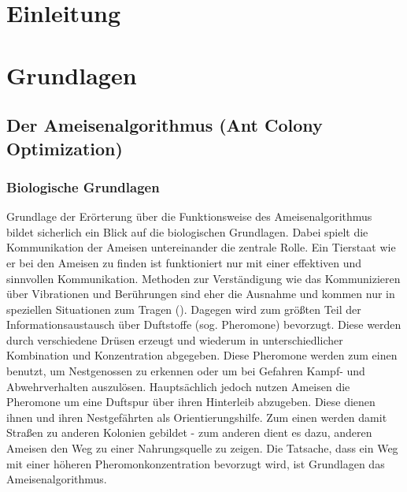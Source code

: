 \documentclass[doktyp=barbeit, sprache=german]{TUBAFarbeiten}
\begin{document}
\maketitle
\tableofcontents
\newpage
\section{Einleitung}
\section{Grundlagen}
\subsection{Der Ameisenalgorithmus (Ant Colony Optimization)}
\subsubsection{Biologische Grundlagen}
Grundlage der Erörterung über die Funktionsweise des Ameisenalgorithmus bildet sicherlich ein Blick auf die biologischen Grundlagen. Dabei spielt die Kommunikation der Ameisen untereinander die zentrale Rolle. Ein Tierstaat wie er bei den Ameisen zu finden ist funktioniert nur mit einer effektiven und sinnvollen Kommunikation. Methoden zur Verständigung wie das Kommunizieren über Vibrationen und Berührungen sind eher die Ausnahme und kommen nur in speziellen Situationen zum Tragen (\cite{Ameisen}). Dagegen wird zum größten Teil der Informationsaustausch über Duftstoffe (sog. Pheromone) bevorzugt. Diese werden durch verschiedene Drüsen erzeugt und wiederum in unterschiedlicher Kombination und Konzentration abgegeben.
Diese Pheromone werden zum einen benutzt, um Nestgenossen zu erkennen oder um bei Gefahren Kampf- und Abwehrverhalten auszulösen. Hauptsächlich jedoch nutzen Ameisen die Pheromone um eine Duftspur über ihren Hinterleib abzugeben. Diese dienen ihnen und ihren Nestgefährten als Orientierungshilfe. Zum einen werden damit Straßen zu anderen Kolonien gebildet - zum anderen dient es dazu, anderen Ameisen den Weg zu einer Nahrungsquelle zu zeigen. Die Tatsache, dass ein Weg mit einer höheren Pheromonkonzentration bevorzugt wird, ist Grundlagen das Ameisenalgorithmus.
\end{document}
